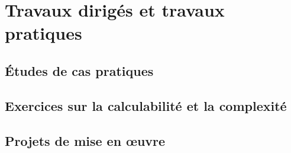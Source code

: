 \chapter{Travaux dirig\'es et travaux pratiques}\label{chap:td_tp}
  \section{\'Etudes de cas pratiques}\label{sec:etudes_cas}
  \section{Exercices sur la calculabilit\'e et la complexit\'e}\label{sec:exercices_calculabilite}
  \section{Projets de mise en \oe uvre}\label{sec:projets_mise_en_oeuvre}